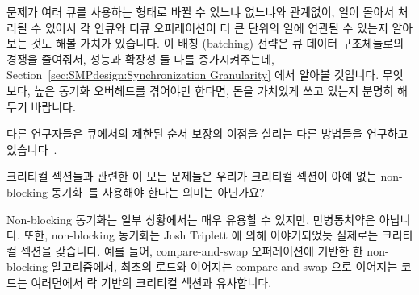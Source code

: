 \begin{enumerate}
	문제가 여러 큐를 사용하는 형태로 바뀔 수 있느냐 없느냐와 관계없이, 일이
	몰아서 처리될 수 있어서 각 인큐와 디큐 오퍼레이션이 더 큰 단위의 일에
	연관될 수 있는지 알아보는 것도 해볼 가치가 있습니다.
	이 배칭 (batching) 전략은 큐 데이터 구조체들로의 경쟁을 줄여줘서,
	성능과 확장성 둘 다를 증가시켜주는데,
	Section~\ref{sec:SMPdesign:Synchronization Granularity} 에서 알아볼
	것입니다.
	무엇보다, 높은 동기화 오버헤드를 겪어야만 한다면, 돈을 가치있게 쓰고
	있는지 분명히 해두기 바랍니다.

	다른 연구자들은 큐에서의 제한된 순서 보장의 이점을 살리는 다른 방법들을
	연구하고 있습니다~\cite{ChristophMKirsch2012FIFOisntTR}.

\QuickQ{}
	크리티컬 섹션들과 관련한 이 모든 문제들은 우리가 크리티컬 섹션이 아예
	없는 non-blocking 동기화~\cite{MauriceHerlihy90a}를 사용해야 한다는
	의미는 아닌가요?

\QuickA{}
	Non-blocking 동기화는 일부 상황에서는 매우 유용할 수 있지만,
	만병통치약은 아닙니다.
	또한, non-blocking 동기화는 Josh Triplett 에 의해 이야기되었듯 실제로는
	크리티컬 섹션을 갖습니다.
	예를 들어, compare-and-swap 오퍼레이션에 기반한 한 non-blocking
	알고리즘에서, 최초의 로드와 이어지는 compare-and-swap 으로 이어지는
	코드는 여러면에서 락 기반의 크리티컬 섹션과 유사합니다.

\end{enumerate}
